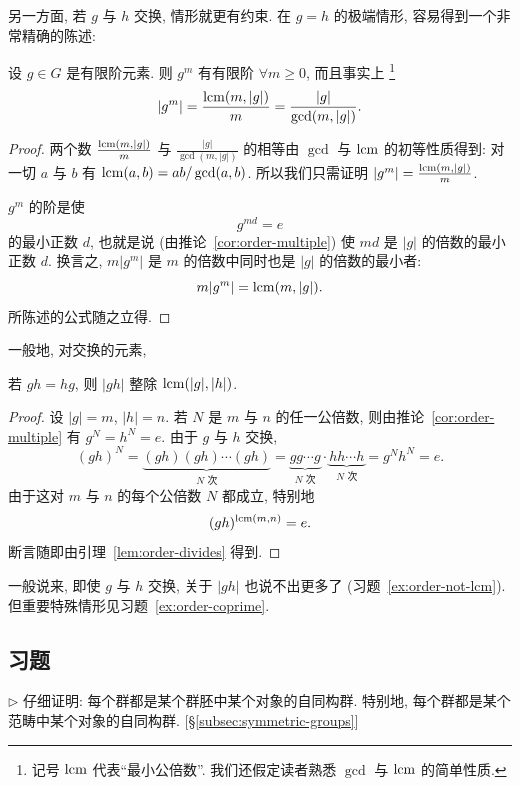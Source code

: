 另一方面, 若 $g$ 与 $h$ 交换, 情形就更有约束. 在 $g = h$ 的极端情形, 容易得到一个非常精确的陈述:

\begin{proposition}
\label{prop:order-power}
设 $g \in G$ 是有限阶元素. 则 $g^m$ 有有限阶 $\forall m \geq 0$, 而且事实上%
\footnote{记号 $\operatorname{lcm}$ 代表``最小公倍数''. 我们还假定读者熟悉 $\gcd$ 与 $\operatorname{lcm}$ 的简单性质.}%
\[
|g^m| = \frac{\operatorname{lcm}(m, |g|)}{m} = \frac{|g|}{\gcd(m, |g|)}.
\]
\end{proposition}

\begin{proof}
两个数 $\frac{\operatorname{lcm}(m, |g|)}{m}$ 与 $\frac{|g|}{\gcd(m, |g|)}$ 的相等由 $\gcd$ 与 $\operatorname{lcm}$ 的初等性质得到: 对一切 $a$ 与 $b$ 有 $\operatorname{lcm}(a,b) = ab/\gcd(a,b)$. 所以我们只需证明 $|g^m| = \frac{\operatorname{lcm}(m, |g|)}{m}$.

$g^m$ 的阶是使
\[
g^{md} = e
\]
的最小正数 $d$, 也就是说 (由推论~\ref{cor:order-multiple}) 使 $md$ 是 $|g|$ 的倍数的最小正数 $d$. 换言之, $m|g^m|$ 是 $m$ 的倍数中同时也是 $|g|$ 的倍数的最小者:
\[
m|g^m| = \operatorname{lcm}(m, |g|).
\]
所陈述的公式随之立得.
\end{proof}

一般地, 对交换的元素,

\begin{proposition}
\label{prop:order-product}
若 $gh = hg$, 则 $|gh|$ 整除 $\operatorname{lcm}(|g|, |h|)$.
\end{proposition}

\begin{proof}
设 $|g| = m$, $|h| = n$. 若 $N$ 是 $m$ 与 $n$ 的任一公倍数, 则由推论~\ref{cor:order-multiple} 有 $g^N = h^N = e$. 由于 $g$ 与 $h$ 交换,
\[
(gh)^N = \underbrace{(gh)(gh) \cdots (gh)}_{N \text{ 次}} = \underbrace{gg \cdots g}_{N \text{ 次}} \cdot \underbrace{hh \cdots h}_{N \text{ 次}} = g^N h^N = e.
\]
由于这对 $m$ 与 $n$ 的每个公倍数 $N$ 都成立, 特别地
\[
(gh)^{\operatorname{lcm}(m,n)} = e.
\]
断言随即由引理~\ref{lem:order-divides} 得到.
\end{proof}

一般说来, 即使 $g$ 与 $h$ 交换, 关于 $|gh|$ 也说不出更多了 (习题~\ref{ex:order-not-lcm}). 但重要特殊情形见习题~\ref{ex:order-coprime}.

\subsection*{习题}
{}

\begin{prob}
\label{ex:group-as-groupoid}
$\triangleright$ 仔细证明: 每个群都是某个群胚中某个对象的自同构群. 特别地, 每个群都是某个范畴中某个对象的自同构群. [\S\ref{subsec:symmetric-groups}]
\end{prob}

